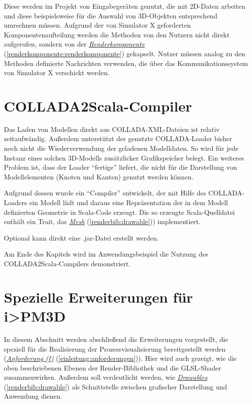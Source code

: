 \documentclass[a4paper,10pt]{sphinxmanual}
\begin{document}
Diese werden im Projekt von Eingabegeräten genutzt, die mit 2D-Daten arbeiten und diese beispielsweise für die Auswahl von 3D-Objekten entsprechend umrechnen müssen.
Aufgrund der von Simulator X geforderten Komponentenaufteilung werden die Methoden von den Nutzern nicht direkt aufgerufen, sondern von der {\hyperref[renderkomponente:renderkomponente]{\emph{Renderkomponente}}} (\autoref*{renderkomponente:renderkomponente}) gekapselt.
Nutzer müssen analog zu den Methoden definierte Nachrichten verwenden, die über das Kommunikationssystem von Simulator X verschickt werden.


\section{COLLADA2Scala-Compiler}
\label{renderbib:collada2scala-compiler}
Das Laden von Modellen direkt aus COLLADA-XML-Dateien ist relativ zeitaufwändig.
Außerdem unterstützt der genutzte COLLADA-Loader \cite{uli} bisher noch nicht die Wiederverwendung der geladenen Modelldaten.
So wird für jede Instanz eines solchen 3D-Modells zusätzlicher Grafikspeicher belegt.
Ein weiteres Problem ist, dass der Loader "`fertige"'  liefert, die nicht für die Darstellung von Modellelementen (Knoten und Kanten) genutzt werden können.

Aufgrund dessen wurde ein "`Compiler"' entwickelt, der mit Hilfe des COLLADA-Loaders ein Modell lädt und daraus eine Repräsentation der in dem Modell definierten Geometrie in Scala-Code erzeugt.
Die so erzeugte Scala-Quelldatei enthält ein Trait, das {\hyperref[renderbib:drawable]{\emph{Mesh}}} (\autoref*{renderbib:drawable})) implementiert.

Optional kann direkt eine .jar-Datei erstellt werden.

Am Ende des Kapitels wird im Anwendungsbeispiel die Nutzung des COLLADA2Scala-Compilers demonstriert.


\section{Spezielle Erweiterungen für i\textgreater{}PM3D}
\label{renderbib:spezielle-erweiterungen-fur-i-pm3d}
In diesem Abschnitt werden abschließend die Erweiterungen vorgestellt, die speziell für die Realisierung der Prozessvisualisierung bereitgestellt werden ({\hyperref[einleitung:anforderungen]{\emph{Anforderung (f)}}} (\autoref*{einleitung:anforderungen})).
Hier wird auch gezeigt, wie die oben beschriebenen Ebenen der Render-Bibliothek und die GLSL-Shader zusammenwirken.
Außerdem soll verdeutlicht werden, wie {\hyperref[renderbib:drawable]{\emph{Drawables}}} (\autoref*{renderbib:drawable}) als Schnittstelle zwischen grafischer Darstellung und Anwendung dienen.
\end{document}
